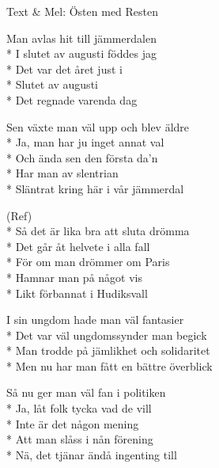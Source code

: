 \begin{SongVerse}[Pessemistkonsulten]
    \begin{SongInfo}
        Text \& Mel: Östen med Resten
    \end{SongInfo}
    \begin{SongVerse}
        Man avlas hit till jämmerdalen\\*%
        I slutet av augusti föddes jag\\*%
        Det var det året just i\\*%
        Slutet av augusti\\*%
        Det regnade varenda dag
    \end{SongVerse}
    \begin{SongVerse}
        Sen växte man väl upp och blev äldre\\*%
        Ja, man har ju inget annat val\\*%
        Och ända sen den första da'n\\*%
        Har man av slentrian\\*%
        Släntrat kring här i vår jämmerdal
    \end{SongVerse}
    \begin{SongVerse}
        (Ref)\\*%
        Så det är lika bra att sluta drömma\\*%
        Det går åt helvete i alla fall\\*%
        För om man drömmer om Paris\\*%
        Hamnar man på något vis\\*%
        Likt förbannat i Hudiksvall
    \end{SongVerse}
    \begin{SongVerse}
        I sin ungdom hade man väl fantasier\\*%
        Det var väl ungdomssynder man begick\\*%
        Man trodde på jämlikhet och solidaritet\\*%
        Men nu har man fått en bättre överblick
    \end{SongVerse}
    \begin{SongVerse}
        Så nu ger man väl fan i politiken\\*%
        Ja, låt folk tycka vad de vill\\*%
        Inte är det någon mening\\*%
        Att man slåss i nån förening\\*%
        Nä, det tjänar ändå ingenting till

\end{SongVerse}
\end{SongVerse}
